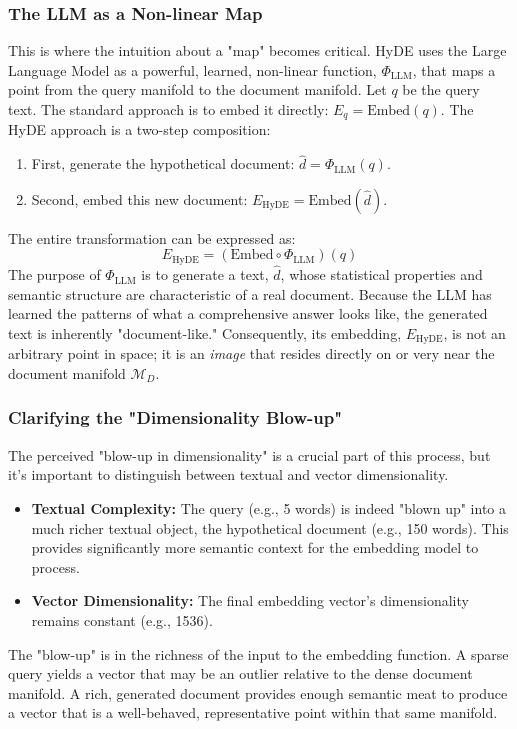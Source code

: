 \documentclass[12pt, a4paper]{article}
\begin{document}
\subsubsection{The LLM as a Non-linear Map}
This is where the intuition about a "map" becomes critical. HyDE uses the Large Language Model as a powerful, learned, non-linear function, $\Phi_{\text{LLM}}$, that maps a point from the query manifold to the document manifold.
Let $q$ be the query text. The standard approach is to embed it directly: $E_q = \text{Embed}(q)$. The HyDE approach is a two-step composition:
\begin{enumerate}
    \item First, generate the hypothetical document: $\hat{d} = \Phi_{\text{LLM}}(q)$.
    \item Second, embed this new document: $E_{\text{HyDE}} = \text{Embed}(\hat{d})$.
\end{enumerate}
The entire transformation can be expressed as:
\begin{equation}
E_{\text{HyDE}} = (\text{Embed} \circ \Phi_{\text{LLM}})(q)
\end{equation}
The purpose of $\Phi_{\text{LLM}}$ is to generate a text, $\hat{d}$, whose statistical properties and semantic structure are characteristic of a real document. Because the LLM has learned the patterns of what a comprehensive answer looks like, the generated text is inherently "document-like." Consequently, its embedding, $E_{\text{HyDE}}$, is not an arbitrary point in space; it is an \textit{image} that resides directly on or very near the document manifold $\mathcal{M}_D$.

\subsubsection{Clarifying the "Dimensionality Blow-up"}
The perceived "blow-up in dimensionality" is a crucial part of this process, but it's important to distinguish between textual and vector dimensionality.
\begin{itemize}
    \item \textbf{Textual Complexity:} The query (e.g., 5 words) is indeed "blown up" into a much richer textual object, the hypothetical document (e.g., 150 words). This provides significantly more semantic context for the embedding model to process.
    \item \textbf{Vector Dimensionality:} The final embedding vector's dimensionality remains constant (e.g., 1536).
\end{itemize}
The "blow-up" is in the richness of the input to the embedding function. A sparse query yields a vector that may be an outlier relative to the dense document manifold. A rich, generated document provides enough semantic meat to produce a vector that is a well-behaved, representative point within that same manifold.
\end{document}
